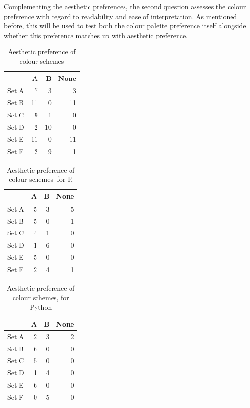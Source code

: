 \documentclass[
  11pt,
]{book}
\begin{document}
Complementing the aesthetic preferences, the second question assesses
the colour preference with regard to readability and ease of
interpretation. As mentioned before, this will be used to test both the
colour palette preference itself alongside whether this preference
matches up with aesthetic preference.

\begin{table}[!h]

\caption{\label{tab:unnamed-chunk-70}Aesthetic preference of colour schemes}
\centering
\begin{tabular}[t]{l|r|r|r}
\hline
  & A & B & None\\
\hline
Set A & 7 & 3 & 3\\
\hline
Set B & 11 & 0 & 11\\
\hline
Set C & 9 & 1 & 0\\
\hline
Set D & 2 & 10 & 0\\
\hline
Set E & 11 & 0 & 11\\
\hline
Set F & 2 & 9 & 1\\
\hline
\end{tabular}
\end{table}

\begin{table}[!h]

\caption{\label{tab:unnamed-chunk-70}Aesthetic preference of colour schemes, for R}
\centering
\begin{tabular}[t]{l|r|r|r}
\hline
  & A & B & None\\
\hline
Set A & 5 & 3 & 5\\
\hline
Set B & 5 & 0 & 1\\
\hline
Set C & 4 & 1 & 0\\
\hline
Set D & 1 & 6 & 0\\
\hline
Set E & 5 & 0 & 0\\
\hline
Set F & 2 & 4 & 1\\
\hline
\end{tabular}
\end{table}

\begin{table}[!h]

\caption{\label{tab:unnamed-chunk-70}Aesthetic preference of colour schemes, for Python}
\centering
\begin{tabular}[t]{l|r|r|r}
\hline
  & A & B & None\\
\hline
Set A & 2 & 3 & 2\\
\hline
Set B & 6 & 0 & 0\\
\hline
Set C & 5 & 0 & 0\\
\hline
Set D & 1 & 4 & 0\\
\hline
Set E & 6 & 0 & 0\\
\hline
Set F & 0 & 5 & 0\\
\hline
\end{tabular}
\end{table}
\end{document}
